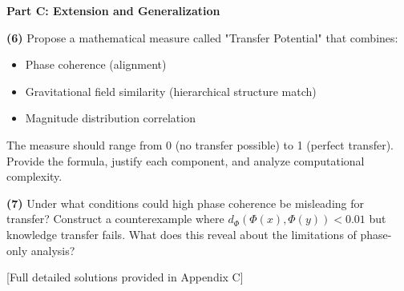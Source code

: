 \begin{critical}
\textbf{Part C: Extension and Generalization}

\textbf{(6)} Propose a mathematical measure called "Transfer Potential" that combines:
\begin{itemize}
\item Phase coherence (alignment)
\item Gravitational field similarity (hierarchical structure match)
\item Magnitude distribution correlation
\end{itemize}

The measure should range from 0 (no transfer possible) to 1 (perfect transfer). Provide the formula, justify each component, and analyze computational complexity.

\textbf{(7)} Under what conditions could high phase coherence be misleading for transfer? Construct a counterexample where $d_{\Phi}(\Phi(x), \Phi(y)) < 0.01$ but knowledge transfer fails. What does this reveal about the limitations of phase-only analysis?
\end{critical}

[Full detailed solutions provided in Appendix C]

